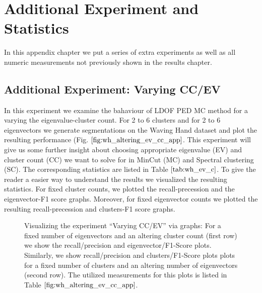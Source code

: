\chapter{Additional Experiment and Statistics}
\label{chap:additional_exp}
In this appendix chapter we put a series of extra experiments as well as all numeric measurements not previously shown in the results chapter.

\section{Additional Experiment: Varying CC/EV}
\label{sec:additional_cc_ev_exp}
In this experiment we examine the bahaviour of LDOF PED MC method for a varying the eigenvalue-cluster count. For 2 to 6 clusters and for 2 to 6 eigenvectors we generate segmentations on the Waving Hand dataset and plot the resulting performance (Fig. $\ref{fig:wh_altering_ev_cc_app}$. This experiment will give us some further insight about choosing appropriate eigenvalue (EV) and cluster count (CC) we want to solve for in MinCut (MC) and Spectral clustering (SC). The corresponding statistics are listed in Table $\ref{tab:wh_ev_c}$. To give the reader a easier way to understand the results we visualized the resulting statistics. For fixed cluster counts, we plotted the recall-precession and the eigenvector-F1 score graphs. Moreover, for fixed eigenvector counts we plotted the resulting recall-precession and clusters-F1 score graphs. 
\begin{figure}[H]
\begin{center}
\end{center}
\caption[Plot Performance Varying CLusters/Eigenvectors]{Visualizing the experiment \enquote{Varying CC/EV} via graphs: For a fixed number of eigenvectors and an altering cluster count (first row) we show the recall/precision and eigenvector/F1-Score plots. Similarly, we show recall/precision and clusters/F1-Score plots plots for a fixed number of clusters and an altering number of eigenvectors (second row). The utilized measurements for this plots is listed in Table $\ref{fig:wh_altering_ev_cc_app}$.}
\label{fig:wh_altering_ev_cc_app}
\end{figure}

